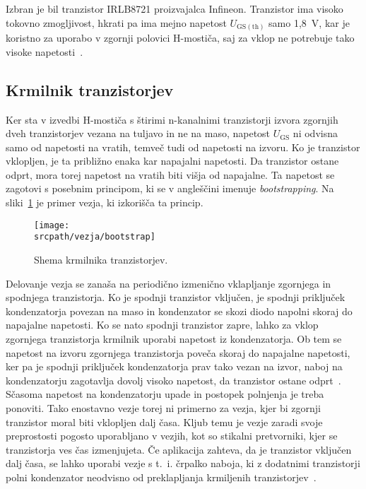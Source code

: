 \documentclass[a4paper,twoside,openright,12pt,slovene]{book}
\newcommand{\srcpath}{res_dark}
\newcommand{\srcpath}{res}
\begin{document}
Izbran je bil tranzistor IRLB8721 proizvajalca Infineon.
Tranzistor ima visoko tokovno zmogljivost, hkrati pa ima mejno napetost $U_\mathrm{GS(th)}$ samo 1,8~V,
kar je koristno za uporabo v zgornji polovici H-mostiča, saj za vklop ne potrebuje tako visoke napetosti~\cite{infineon_technologies_ag_irlb8721_nodate}.

\subsection{Krmilnik tranzistorjev} \label{subsec:krmilnik-tranzistorjev}
Ker sta v izvedbi H-mostiča s štirimi n-kanalnimi tranzistorji izvora zgornjih dveh tranzistorjev vezana na tuljavo in ne na maso,
napetost $U_\mathrm{GS}$ ni odvisna samo od napetosti na vratih, temveč tudi od napetosti na izvoru.
Ko je tranzistor vklopljen, je ta približno enaka kar napajalni napetosti.
Da tranzistor ostane odprt, mora torej napetost na vratih biti višja od napajalne.
Ta napetost se zagotovi s posebnim principom, ki se v angleščini imenuje \textit{bootstrapping}.
Na sliki~\ref{fig:bootstrap_krmilnik} je primer vezja, ki izkorišča ta princip.
\begin{figure}[H]
    \centering
    \texttt{[image: \\srcpath/vezja/bootstrap]}
    \caption{\label{fig:bootstrap_krmilnik} Shema krmilnika tranzistorjev.}
\end{figure}

Delovanje vezja se zanaša na periodično izmenično vklapljanje zgornjega in spodnjega tranzistorja.
Ko je spodnji tranzistor vključen, je spodnji priključek kondenzatorja povezan na maso in kondenzator se skozi diodo napolni skoraj do napajalne napetosti.
Ko se nato spodnji tranzistor zapre, lahko za vklop zgornjega tranzistorja krmilnik uporabi napetost iz kondenzatorja.
Ob tem se napetost na izvoru zgornjega tranzistorja poveča skoraj do napajalne napetosti, ker pa je spodnji priključek kondenzatorja prav tako vezan na izvor,
naboj na kondenzatorju zagotavlja dovolj visoko napetost, da tranzistor ostane odprt~\cite{ali_design_2010}.
Sčasoma napetost na kondenzatorju upade in postopek polnjenja je treba ponoviti.
Tako enostavno vezje torej ni primerno za vezja, kjer bi zgornji tranzistor moral biti vklopljen dalj časa.
Kljub temu je vezje zaradi svoje preprostosti pogosto uporabljano v vezjih, kot so stikalni pretvorniki, kjer se tranzistorja ves čas izmenjujeta.
Če aplikacija zahteva, da je tranzistor vključen dalj časa, se lahko uporabi vezje s t.~i.
črpalko naboja, ki z dodatnimi tranzistorji polni kondenzator neodvisno od preklapljanja krmiljenih tranzistorjev~\cite{park_self-boost_2005}.
\end{document}
